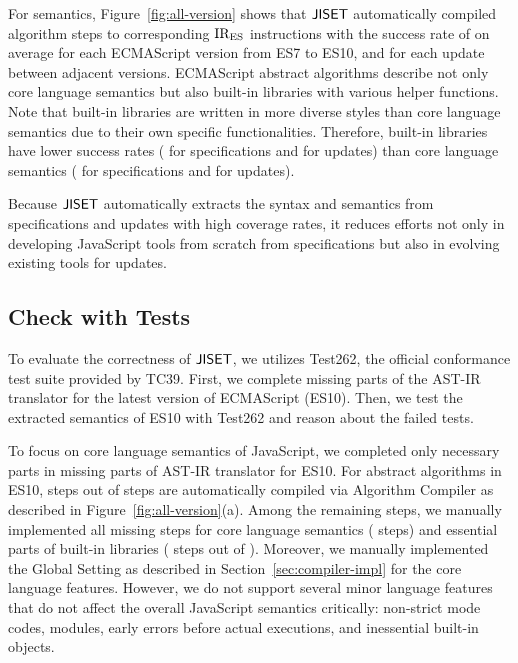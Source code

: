 For semantics, Figure~\ref{fig:all-version} shows that \( \text{\sf JISET} \) automatically
compiled algorithm steps to corresponding \( \text{IR}_\text{ES} \) instructions with
the success rate of  on average for each ECMAScript version
from ES7 to ES10, and  for each update between adjacent
versions.  ECMAScript abstract algorithms describe not only
core language semantics but also built-in libraries with various helper functions.
Note that built-in libraries are written in more diverse styles than
core language semantics due to their own specific functionalities.
Therefore, built-in libraries have lower success rates
( for specifications and  for updates) than core
language semantics ( for specifications and  for
updates).

Because \( \text{\sf JISET} \) automatically extracts the syntax
and semantics from specifications and updates with high coverage rates,
it reduces efforts not only in developing JavaScript tools from scratch
from specifications but also in evolving existing tools for updates.


\subsection{Check with Tests}\label{sec:check-with-tests}

To evaluate the correctness of \( \text{\sf JISET} \), we utilizes Test262, the official
conformance test suite provided by TC39.  First, we complete missing parts of
the AST-IR translator for the latest version of ECMAScript (ES10). Then, we
test the extracted semantics of ES10 with Test262 and reason about the failed
tests.

To focus on core language semantics of JavaScript, we completed only necessary
parts in missing parts of AST-IR translator for ES10.  For abstract algorithms
in ES10,  steps out of  steps are automatically
compiled via \textsf{Algorithm Compiler} as described in
Figure~\ref{fig:all-version}(a).  Among the remaining  steps, we
manually implemented all missing steps for core language semantics (
steps) and essential parts of built-in libraries ( steps out of
).  Moreover, we manually implemented the \textsf{Global Setting} as
described in Section~\ref{sec:compiler-impl} for the core language features.
However, we do not support several minor language features that do not affect
the overall JavaScript semantics critically: non-strict mode codes, modules,
early errors before actual executions, and inessential built-in objects.

